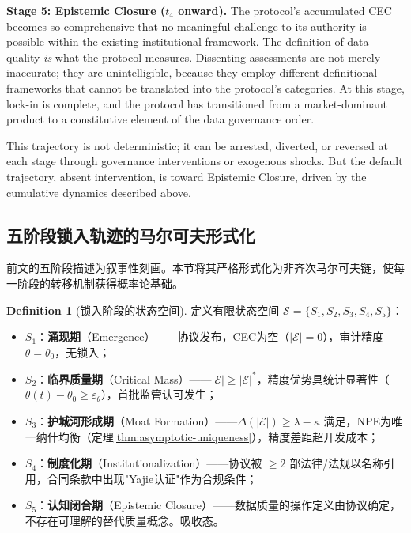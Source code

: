 \documentclass[12pt,a4paper]{ctexart}
\theoremstyle{definition}
\newtheorem{definition}{Definition}[section]
\theoremstyle{remark}
\begin{document}
\textbf{Stage 5: Epistemic Closure ($t_4$ onward).} The protocol's accumulated CEC becomes so comprehensive that no meaningful challenge to its authority is possible within the existing institutional framework. The definition of data quality \textit{is} what the protocol measures. Dissenting assessments are not merely inaccurate; they are unintelligible, because they employ different definitional frameworks that cannot be translated into the protocol's categories. At this stage, lock-in is complete, and the protocol has transitioned from a market-dominant product to a constitutive element of the data governance order.

This trajectory is not deterministic; it can be arrested, diverted, or reversed at each stage through governance interventions or exogenous shocks. But the default trajectory, absent intervention, is toward Epistemic Closure, driven by the cumulative dynamics described above.

\subsection{五阶段锁入轨迹的马尔可夫形式化}

前文的五阶段描述为叙事性刻画。本节将其严格形式化为非齐次马尔可夫链，使每一阶段的转移机制获得概率论基础。

\begin{definition}[锁入阶段的状态空间]
\label{def:markov-states}
定义有限状态空间 $\mathcal{S} = \{S_1, S_2, S_3, S_4, S_5\}$：
\begin{itemize}[itemsep=2pt]
\item $S_1$：\textbf{涌现期}（Emergence）——协议发布，CEC为空（$|\mathcal{E}| = 0$），审计精度 $\theta = \theta_0$，无锁入；
\item $S_2$：\textbf{临界质量期}（Critical Mass）——$|\mathcal{E}| \geq |\mathcal{E}|^*$，精度优势具统计显著性（$\theta(t) - \theta_0 \geq \varepsilon_\theta$），首批监管认可发生；
\item $S_3$：\textbf{护城河形成期}（Moat Formation）——$\Delta(|\mathcal{E}|) \geq \lambda - \kappa$ 满足，NPE为唯一纳什均衡（定理\ref{thm:asymptotic-uniqueness}），精度差距超开发成本；
\item $S_4$：\textbf{制度化期}（Institutionalization）——协议被 $\geq 2$ 部法律/法规以名称引用，合同条款中出现"Yajie认证"作为合规条件；
\item $S_5$：\textbf{认知闭合期}（Epistemic Closure）——数据质量的操作定义由协议确定，不存在可理解的替代质量概念。吸收态。
\end{itemize}
\end{definition}
\end{document}
